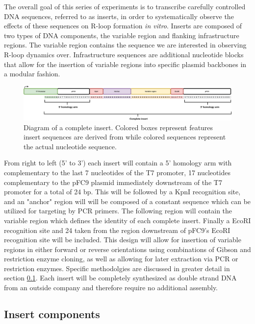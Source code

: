 \documentclass[11pt]{article}
\begin{document}
The overall goal of this series of experiments is to transcribe carefully controlled DNA sequences, referred to as inserts, in order to systematically observe the effects of these sequences on R-loop formation \emph{in vitro}. Inserts are composed of two types of DNA components, the variable region and flanking infrastructure regions. The variable region contains the sequence we are interested in observing R-loop dynamics over. Infrastructure sequences are additional nucleotide blocks that allow for the insertion of variable regions into specific plasmid backbones in a modular fashion. 

\begin{figure}[H]
	\includegraphics[width=16cm]{images/variable_region/construct_diagrams-Detailed-Insert.png}
	\centering
	\caption{Diagram of a complete insert. Colored boxes represent features insert sequences are derived from while colored sequences represent the actual nucleotide sequence.}
	\label{fig:1}
\end{figure}

From right to left (5' to 3') each insert will contain a 5' homology arm with complementary to the last 7 nucleotides of the T7 promoter, 17 nucleotides complementary to the pFC9 plasmid immediately downstream of the T7 promoter for a total of 24 bp. This will be followed by a KpnI recognition site, and an "anchor" region will will be composed of a constant sequence which can be utilized for targeting by PCR primers. The following region will contain the variable region which defines the identity of each complete insert. Finally a EcoRI recognition site and 24 taken from the region downstream of pFC9's EcoRI recognition site will be included. This design will allow for insertion of variable regions in either forward or reverse orientations using combinations of Gibson and restriction enzyme cloning, as well as allowing for later extraction via PCR or restriction enzymes. Specific methodolgies are discussed in greater detail in section \ref{}. Each insert will be completely synthesized as double strand DNA from an outside company and therefore require no additional assembly. 

\subsection{Insert components}
\end{document}
